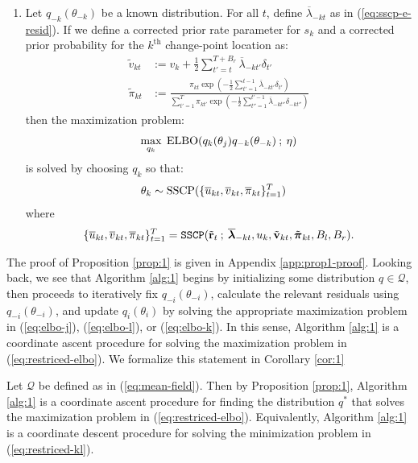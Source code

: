 \begin{proposition}
\begin{enumerate}[label=\roman*.]
    \item Let $q_{-k}(\theta_{-k})$ be a known distribution. For all $t$, define $\overline{\lambda}_{-kt}$ as in (\ref{eq:sscp-e-resid}). If we define a corrected prior rate parameter for $s_k$ and a corrected prior probability for the $k^{\text{th}}$ change-point location as:
    \begin{align}
        \tilde{v}_{kt} &:= v_k + \frac{1}{2}\sum_{t'=t}^{T+B_r}\overline{\lambda}_{-kt'}\delta_{t'} \label{eq:mod-v_k} \\
        \tilde{\pi}_{kt} &:= \frac{\pi_{kt} \exp\left(-\frac{1}{2}\sum_{t'=1}^{t-1}\overline{\lambda}_{-kt'}\delta_{t'}\right)}{\sum_{t'=1}^T \pi_{kt'} \exp\left(-\frac{1}{2}\sum_{t''=1}^{t'-1}\overline{\lambda}_{-kt''}\delta_{-kt''}\right)} \label{eq:mod-pi_k}
    \end{align}
    then the maximization problem:
    \begin{align}
        \normalfont
        \max_{q_k} \;\text{ELBO}(q_k(\theta_j)q_{-k}(\theta_{-k}) \:;\: \eta) \label{eq:elbo-k}
    \end{align}
    is solved by choosing $q_k$ so that: 
    \begin{align*}
        \normalfont
        \theta_k &\sim \normalfont \text{SSCP}(\{\overline{u}_{kt}, \overline{v}_{kt}, \overline{\pi}_{kt}\}_{t=1}^T)
    \end{align*}
    where 
    \begin{align*}
        \normalfont
        \{\overline{u}_{kt}, \overline{v}_{kt}, \overline{\pi}_{kt}\}_{t=1}^T = \texttt{SSCP}(\tilde{\mathbf{r}}_{t} \:;\: \overline{\boldsymbol{\lambda}}_{-kt}, u_k, \tilde{\mathbf{v}}_{kt}, \tilde{\boldsymbol{\pi}}_{kt}, B_l,B_r).
    \end{align*}
\end{enumerate}
\end{proposition}
The proof of Proposition \ref{prop:1} is given in Appendix \ref{app:prop1-proof}. Looking back, we see that Algorithm \ref{alg:1} begins by initializing some distribution $q \in \mathcal{Q}$, then proceeds to iteratively fix $q_{-i}(\theta_{-i})$, calculate the relevant residuals using $q_{-i}(\theta_{-i})$, and update $q_{i}(\theta_{i})$ by solving the appropriate maximization problem in (\ref{eq:elbo-j}), (\ref{eq:elbo-l}), or (\ref{eq:elbo-k}). In this sense, Algorithm \ref{alg:1} is a coordinate ascent procedure for solving the maximization problem in (\ref{eq:restriced-elbo}). We formalize this statement in Corollary \ref{cor:1}
\begin{corollary}
\label{cor:1} 
Let $\mathcal{Q}$ be defined as in (\ref{eq:mean-field}). Then by Proposition \ref{prop:1}, Algorithm \ref{alg:1} is a coordinate ascent procedure for finding the distribution $q^*$ that solves the maximization problem in (\ref{eq:restriced-elbo}). Equivalently, Algorithm \ref{alg:1} is a coordinate descent procedure for solving the minimization problem in (\ref{eq:restriced-kl}).
\end{corollary}
